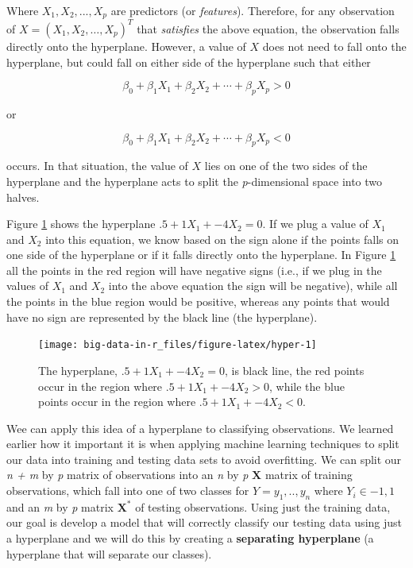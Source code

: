 \documentclass[]{book}
\begin{document}
Where \(X_1, X_2, ..., X_p\) are predictors (or \emph{features}). Therefore, for any observation of \(X = (X_1, X_2, \dots, X_p)^T\) that \emph{satisfies} the above equation, the observation falls directly onto the hyperplane. However, a value of \(X\) does not need to fall onto the hyperplane, but could fall on either side of the hyperplane such that either

\[
\beta_0 + \beta_1X_1 + \beta_2X_2 + \cdots + \beta_pX_p > 0
\]

or

\[
\beta_0 + \beta_1X_1 + \beta_2X_2 + \cdots + \beta_pX_p < 0
\]

occurs. In that situation, the value of \(X\) lies on one of the two sides of the hyperplane and the hyperplane acts to split the \emph{p}-dimensional space into two halves.

Figure \ref{fig:hyper} shows the hyperplane \(.5 + 1X_1 + -4X_2 = 0\). If we plug a value of \(X_1\) and \(X_2\) into this equation, we know based on the sign alone if the points falls on one side of the hyperplane or if it falls directly onto the hyperplane. In Figure \ref{fig:hyper} all the points in the red region will have negative signs (i.e., if we plug in the values of \(X_1\) and \(X_2\) into the above equation the sign will be negative), while all the points in the blue region would be positive, whereas any points that would have no sign are represented by the black line (the hyperplane).

\begin{figure}
\texttt{[image: big-data-in-r\_files/figure-latex/hyper-1]} \caption{The hyperplane, $.5 + 1X_1 + -4X_2 = 0$, is black line, the red points occur in the region where $.5 + 1X_1 + -4X_2 > 0$, while the blue points occur in the region where $.5 + 1X_1 + -4X_2 < 0$.}\label{fig:hyper}
\end{figure}

Wee can apply this idea of a hyperplane to classifying observations. We learned earlier how it important it is when applying machine learning techniques to split our data into training and testing data sets to avoid overfitting. We can split our \emph{n + m} by \emph{p} matrix of observations into an \emph{n} by \emph{p} \(\mathbf{X}\) matrix of training observations, which fall into one of two classes for \(Y = y_1, .., y_n\) where \(Y_i \in {-1, 1}\) and an \emph{m} by \emph{p} matrix \(\mathbf{X^*}\) of testing observations. Using just the training data, our goal is develop a model that will correctly classify our testing data using just a hyperplane and we will do this by creating a \textbf{separating hyperplane} (a hyperplane that will separate our classes).
\end{document}
